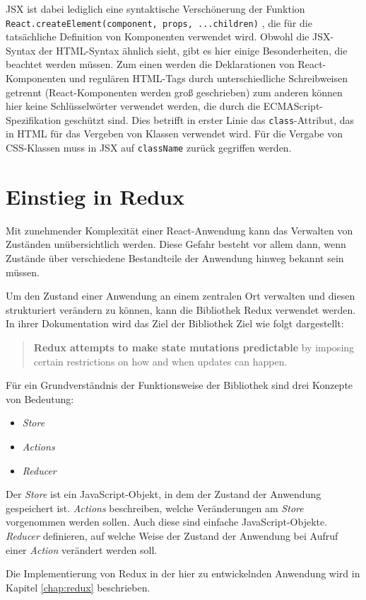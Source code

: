 JSX ist dabei lediglich eine syntaktische Verschönerung der Funktion \texttt{React.\-create\-Element(component,\- props,\- ...children)} \cite{ReactJSX}, die für die tatsächliche Definition von Komponenten verwendet wird.
Obwohl die JSX-Syntax der HTML-Syntax ähnlich sieht, gibt es hier einige Besonderheiten, die beachtet werden müssen.
Zum einen werden die Deklarationen von React-Komponenten und regulären HTML-Tags durch unterschiedliche Schreibweisen getrennt (React-Komponenten werden groß geschrieben) zum anderen können hier keine Schlüsselwörter verwendet werden, die durch die ECMAScript-Spezifikation geschützt sind\footnotemark{}. Dies betrifft in erster Linie das \verb|class|-Attribut, das in HTML für das Vergeben von Klassen verwendet wird. Für die Vergabe von CSS-Klassen muss in JSX auf \verb|className| zurück gegriffen werden.


\section{Einstieg in Redux}
Mit zunehmender Komplexität einer React-Anwendung kann das Verwalten von Zuständen unübersichtlich werden. Diese Gefahr besteht vor allem dann, wenn Zustände über verschiedene Bestandteile der Anwendung hinweg bekannt sein müssen.

Um den Zustand einer Anwendung an einem zentralen Ort verwalten und diesen strukturiert verändern zu können, kann die Bibliothek Redux\footnotemark{} verwendet werden. In ihrer Dokumentation wird das Ziel der Bibliothek Ziel wie folgt dargestellt:


\begin{quote}
  \textbf{Redux attempts to make state mutations predictable} by imposing certain restrictions on how and when updates can happen. \cite{ReduxMotivation}
\end{quote}

Für ein Grundverständnis der Funktionsweise der Bibliothek sind drei Konzepte von Bedeutung:

\begin{itemize}
  \item \textit{Store}
  \item \textit{Actions}
  \item \textit{Reducer}
\end{itemize}

Der \textit{Store} ist ein JavaScript-Objekt, in dem der Zustand der Anwendung gespeichert ist. \textit{Actions} beschreiben, welche Veränderungen am \textit{Store} vorgenommen werden sollen. Auch diese sind einfache JavaScript-Objekte. \textit{Reducer} definieren, auf welche Weise der Zustand der Anwendung bei Aufruf einer \textit{Action} verändert werden soll. \cite{ReduxCore}

Die Implementierung von Redux in der hier zu entwickelnden Anwendung wird in Kapitel \ref{chap:redux} beschrieben.
